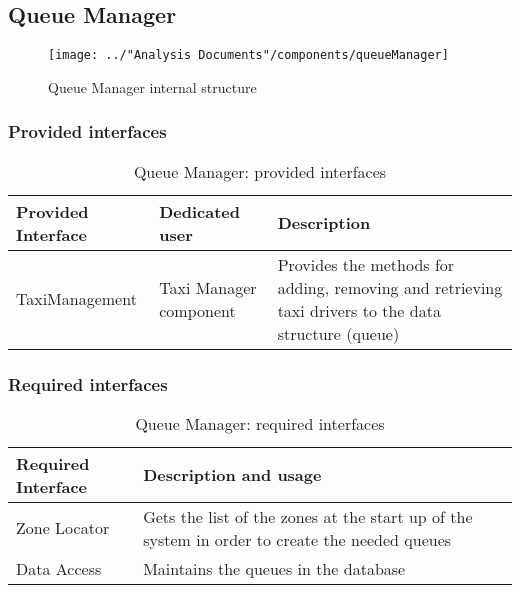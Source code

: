 \subsection{Queue Manager}
\begin{figure}[H]
	\centering
	\texttt{[image: ../"Analysis Documents"/components/queueManager]}
	\label{fig:queuemanager}
	\caption{Queue Manager internal structure}
\end{figure}
\subsubsection{Provided interfaces}
\begin{table}[H]
	\begin{longtable}{| p{} | p{} | p{} |}
		\hline
		\textbf{Provided Interface} & \textbf{Dedicated user} & \textbf{Description} \\ \hline
		TaxiManagement & Taxi Manager component & Provides the methods for adding, removing and retrieving taxi drivers to the data structure (queue) \\ \hline
	\end{longtable}
	\caption{Queue Manager: provided interfaces}
	\label{tab:queuemanager:providedInterfaces}
\end{table}
\subsubsection{Required interfaces}
\begin{table}[H]
	\begin{longtable}{| l | p{} |}
		\hline
		\textbf{Required Interface} & \textbf{Description and usage} \\ \hline
		Zone Locator & Gets the list of the zones at the start up of the system in order to create the needed queues \\ \hline
		Data Access & Maintains the queues in the database \\ \hline
	\end{longtable}
	\caption{Queue Manager: required interfaces}
	\label{tab:queuemanager:requiredInterfaces}
\end{table}
